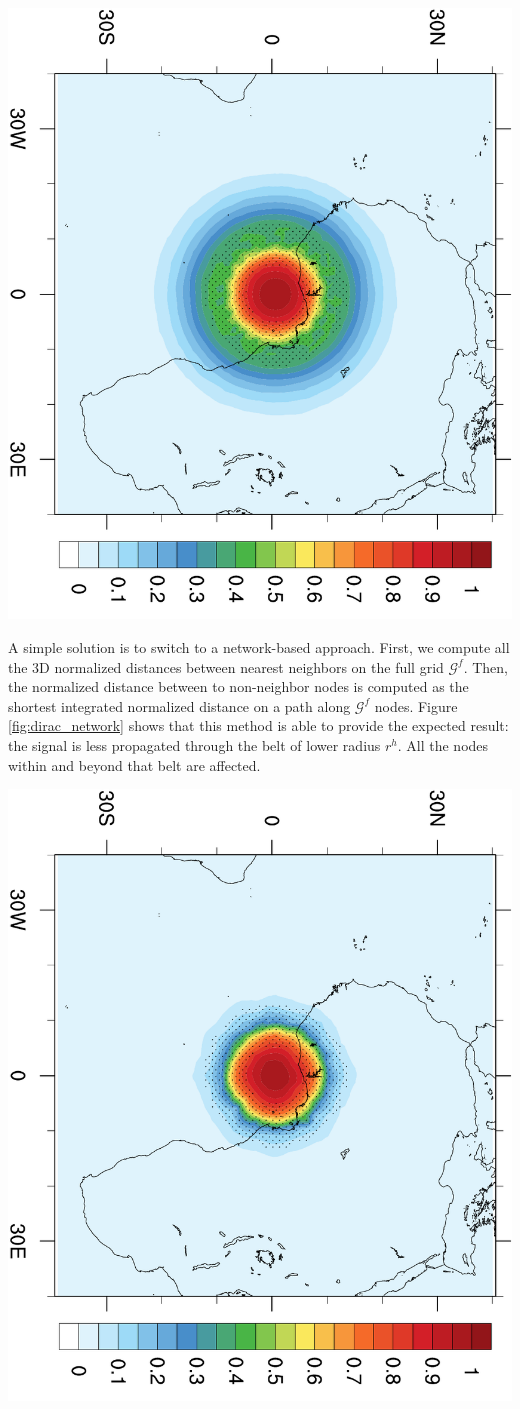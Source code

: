 \documentclass[12pt]{scrartcl}
\begin{document}
\begin{center}
\includegraphics[height=0.63\linewidth,angle=90]{arp_6B60_dirac_001_distance.pdf}
\end{center}

A simple solution is to switch to a network-based approach. First, we compute all the 3D normalized distances between nearest neighbors on the full grid $\mathcal{G}^f$. Then, the normalized distance between to non-neighbor nodes is computed as the shortest integrated normalized distance on a path along $\mathcal{G}^f$ nodes. Figure \ref{fig:dirac_network} shows that this method is able to provide the expected result: the signal is less propagated through the belt of lower radius $r^h$. All the nodes within and beyond that belt are affected.

\begin{center}
\includegraphics[height=0.63\linewidth,angle=90]{arp_6B60_dirac_001_network.pdf}
\end{center}
\end{document}
